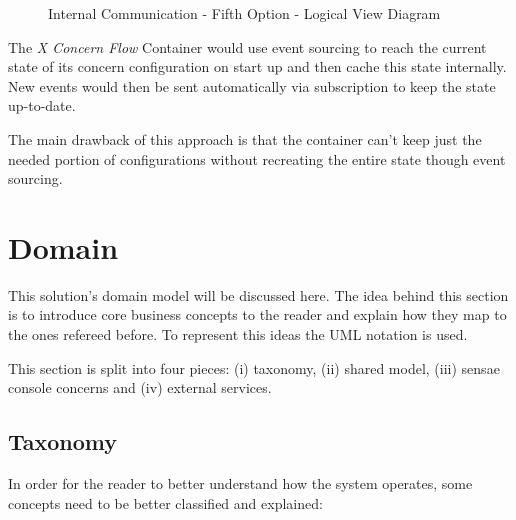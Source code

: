 \begin{figure}[H]
   \centering
   \resizebox{\columnwidth}{!}
   {
      
   }
   \caption[Internal Communication - Fifth Option - Logical View Diagram]{Internal Communication - Fifth Option - Logical View Diagram}
   \label{fig:design:alternatives:internal:fifth:diagram}
\end{figure}

The \textit{X Concern Flow} Container would use event sourcing to reach the current state of its concern configuration on start up and then cache this state internally. New events would then be sent automatically via subscription to keep the state up-to-date.

The main drawback of this approach is that the container can't keep just the needed portion of configurations without recreating the entire state though event sourcing.

\section{Domain}
\label{sec:design:domain}

This solution's domain model will be discussed here. The idea behind this section is to introduce core business concepts to the reader and explain how they map to the ones refereed before. To represent this ideas the \gls{UML} notation is used.

This section is split into four pieces: (i) taxonomy, (ii) shared model, (iii) sensae console concerns and (iv) external services.

\subsection{Taxonomy}
\label{subsec:design:domain:taxonomy}

In order for the reader to better understand how the system operates, some concepts need to be better classified and explained:

